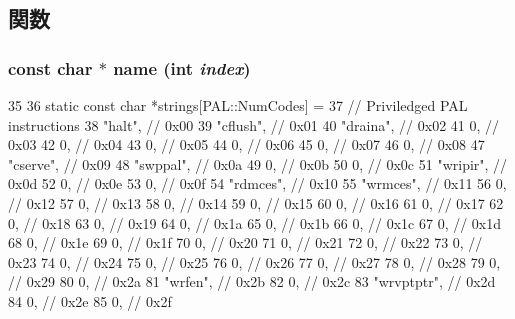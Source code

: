 \subsection{関数}
\hypertarget{structPAL_a83e290f4b7ec996662186ef760c48681}{
\subsubsection[{name}]{\setlength{\rightskip}{0pt plus 5cm}const char $\ast$ name (int {\em index})}}
\label{structPAL_a83e290f4b7ec996662186ef760c48681}



\begin{DoxyCode}
35 {
36     static const char *strings[PAL::NumCodes] = {
37         // Priviledged PAL instructions
38         "halt",         // 0x00
39         "cflush",       // 0x01
40         "draina",       // 0x02
41         0,              // 0x03
42         0,              // 0x04
43         0,              // 0x05
44         0,              // 0x06
45         0,              // 0x07
46         0,              // 0x08
47         "cserve",       // 0x09
48         "swppal",       // 0x0a
49         0,              // 0x0b
50         0,              // 0x0c
51         "wripir",       // 0x0d
52         0,              // 0x0e
53         0,              // 0x0f
54         "rdmces",       // 0x10
55         "wrmces",       // 0x11
56         0,              // 0x12
57         0,              // 0x13
58         0,              // 0x14
59         0,              // 0x15
60         0,              // 0x16
61         0,              // 0x17
62         0,              // 0x18
63         0,              // 0x19
64         0,              // 0x1a
65         0,              // 0x1b
66         0,              // 0x1c
67         0,              // 0x1d
68         0,              // 0x1e
69         0,              // 0x1f
70         0,              // 0x20
71         0,              // 0x21
72         0,              // 0x22
73         0,              // 0x23
74         0,              // 0x24
75         0,              // 0x25
76         0,              // 0x26
77         0,              // 0x27
78         0,              // 0x28
79         0,              // 0x29
80         0,              // 0x2a
81         "wrfen",        // 0x2b
82         0,              // 0x2c
83         "wrvptptr",     // 0x2d
84         0,              // 0x2e
85         0,              // 0x2f
}}
\end{DoxyCode}
